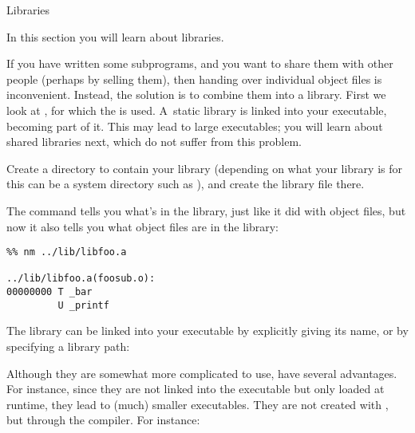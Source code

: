  {Libraries}

\begin{purpose}
  In this section you will learn about libraries.
\end{purpose}

If you have written some subprograms, and you want to share them with
other people (perhaps by selling them), then handing over individual
object files is inconvenient. Instead, the solution is to combine them
into a library. First we look at , for
which the   is used. A~static library
is linked into your executable, becoming part of it. This may lead to
large executables; you will learn about shared libraries
next, which do not suffer from this problem.

Create a directory to contain your library (depending on what your
library is for this can be a
system directory such as ), and create the library file
there. 


\begin{comment}
\begin{verbatim}
%% mkdir ../lib
%% ar cr ../lib/libfoo.a foosub.o
\end{verbatim}
\end{comment}

The  command tells you what's in the library, just
like it did with object files, but now it also tells you what object
files are in the library:
\begin{verbatim}
%% nm ../lib/libfoo.a 

../lib/libfoo.a(foosub.o):
00000000 T _bar
         U _printf
\end{verbatim}

The library can be linked into your executable by explicitly giving
its name, or by specifying a library path:


\begin{comment}
\begin{verbatim}
%% gcc -o foo fooprog.o ../lib/libfoo.a
# or
%% gcc -o foo fooprog.o -L../lib -lfoo
%% ./foo
hello world
\end{verbatim}
\end{comment}

Although they are somewhat more complicated to use, 
have several advantages. For
instance, since they are not linked into the executable but only
loaded at runtime, they lead to (much) smaller executables. They are
not created with , but through the compiler. For instance:

